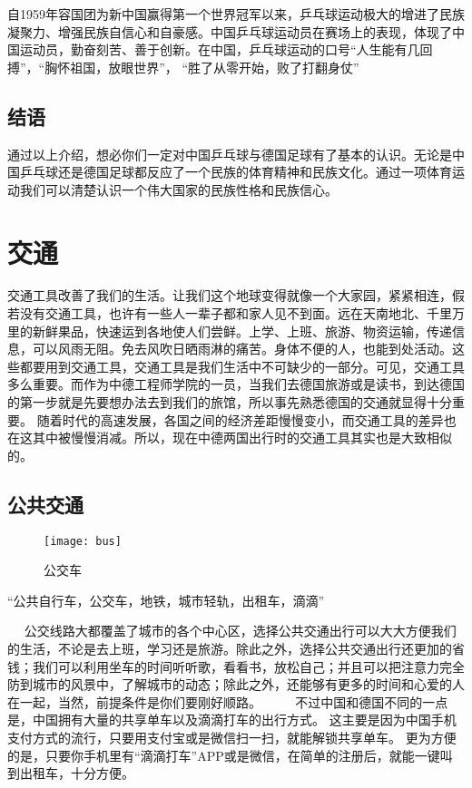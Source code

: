     自1959年容国团为新中国赢得第一个世界冠军以来，乒乓球运动极大的增进了民族凝聚力、增强民族自信心和自豪感。中国乒乓球运动员在赛场上的表现，体现了中国运动员，勤奋刻苦、善于创新。在中国，乒乓球运动的口号“人生能有几回搏”，“胸怀祖国，放眼世界”， “胜了从零开始，败了打翻身仗”

\subsection{结语}
    通过以上介绍，想必你们一定对中国乒乓球与德国足球有了基本的认识。无论是中国乒乓球还是德国足球都反应了一个民族的体育精神和民族文化。通过一项体育运动我们可以清楚认识一个伟大国家的民族性格和民族信心。



\section{交通}
    交通工具改善了我们的生活。让我们这个地球变得就像一个大家园，紧紧相连，假若没有交通工具，也许有一些人一辈子都和家人见不到面。远在天南地北、千里万里的新鲜果品，快速运到各地使人们尝鲜。上学、上班、旅游、物资运输，传递信息，可以风雨无阻。免去风吹日晒雨淋的痛苦。身体不便的人，也能到处活动。这些都要用到交通工具，交通工具是我们生活中不可缺少的一部分。可见，交通工具多么重要。而作为中德工程师学院的一员，当我们去德国旅游或是读书，到达德国的第一步就是先要想办法去到我们的旅馆，所以事先熟悉德国的交通就显得十分重要。
    随着时代的高速发展，各国之间的经济差距慢慢变小，而交通工具的差异也在这其中被慢慢消减。所以，现在中德两国出行时的交通工具其实也是大致相似的。

\subsection{公共交通}
\begin{figure}[htb]
    \centering
    \texttt{[image: bus]}
    \caption{公交车}
\end{figure}

    “公共自行车，公交车，地铁，城市轻轨，出租车，滴滴” 

    公交线路大都覆盖了城市的各个中心区，选择公共交通出行可以大大方便我们的生活，不论是去上班，学习还是旅游。除此之外，选择公共交通出行还更加的省钱；我们可以利用坐车的时间听听歌，看看书，放松自己；并且可以把注意力完全防到城市的风景中，了解城市的动态；除此之外，还能够有更多的时间和心爱的人在一起，当然，前提条件是你们要刚好顺路。 
  
    不过中国和德国不同的一点是，中国拥有大量的共享单车以及滴滴打车的出行方式。 这主要是因为中国手机支付方式的流行，只要用支付宝或是微信扫一扫，就能解锁共享单车。 更为方便的是，只要你手机里有“滴滴打车”APP或是微信，在简单的注册后，就能一键叫到出租车，十分方便。

